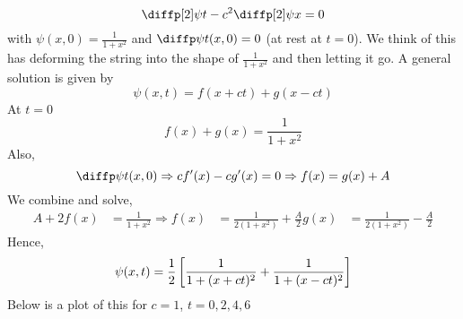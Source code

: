 \documentclass{article}
\begin{document}
\begin{eg}
    \[
        \diffp[2] \psi t - c^2 \diffp[2] \psi x = 0
    \]
    with $\psi(x, 0) = \frac{1}{1 + x^2}$ and $\diffp \psi t (x, 0) = 0$ (at rest at $t = 0$).
    We think of this has deforming the string into the shape of $\frac{1}{1 + x^2}$ and then letting it go.
    A general solution is given by
    \[
        \psi(x, t) = f(x + ct) + g(x - ct)  
    \]
    At $t = 0$
    \[
        f(x) + g(x) = \frac{1}{1 + x^2}  
    \]
    Also,
    \[
        \diffp \psi t (x, 0) \Rightarrow cf'(x) - cg'(x) = 0 \Rightarrow f(x) = g(x) + A
    \]
    We combine and solve,
    \begin{align*}
        A + 2 f(x) &= \frac{1}{1 + x^2}
        \Rightarrow f(x) &= \frac{1}{2(1 + x^2)} + \frac{A}{2}
        g(x) &=  \frac{1}{2(1 + x^2)} - \frac{A}{2}
    \end{align*}
    Hence, 
    \[
        \psi(x, t) = \frac{1}{2} \left[ \frac{1}{1 + (x + ct)^2} + \frac{1}{1 + (x - ct)^2} \right]
    \]
    Below is a plot of this for $c = 1$, $t=0, 2, 4, 6$
    \begin{center}
    \end{center}
\end{eg}
\end{document}
